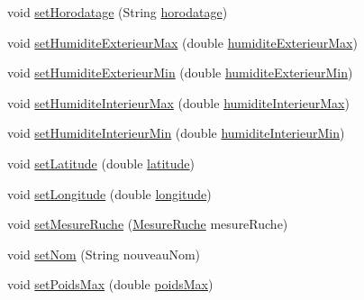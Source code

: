 \begin{DoxyCompactItemize}
\item 
void \hyperlink{classcom_1_1example_1_1bee__honeyt_1_1_ruche_aff1e1caa39a1d012b1714df3902941f8}{set\+Horodatage} (String \hyperlink{classcom_1_1example_1_1bee__honeyt_1_1_ruche_a93b3665d844cbba761ebf9a19a1d7d34}{horodatage})
\item 
void \hyperlink{classcom_1_1example_1_1bee__honeyt_1_1_ruche_a8ed5f5c7ede5ca2172306b91a0b6c9b7}{set\+Humidite\+Exterieur\+Max} (double \hyperlink{classcom_1_1example_1_1bee__honeyt_1_1_ruche_a76e636b4d5e0a18b187905e0d6d73a71}{humidite\+Exterieur\+Max})
\item 
void \hyperlink{classcom_1_1example_1_1bee__honeyt_1_1_ruche_ab4e0d29d75a71336a51dad3d4f17b758}{set\+Humidite\+Exterieur\+Min} (double \hyperlink{classcom_1_1example_1_1bee__honeyt_1_1_ruche_ad58b8815412827add256f6c6e11d3043}{humidite\+Exterieur\+Min})
\item 
void \hyperlink{classcom_1_1example_1_1bee__honeyt_1_1_ruche_aa17a8858db45900b9087e0f35bdf2e23}{set\+Humidite\+Interieur\+Max} (double \hyperlink{classcom_1_1example_1_1bee__honeyt_1_1_ruche_a1483266a1f1ba7d83e0f69bef8e26231}{humidite\+Interieur\+Max})
\item 
void \hyperlink{classcom_1_1example_1_1bee__honeyt_1_1_ruche_ac06e9c83418f30546fea5d29f250b323}{set\+Humidite\+Interieur\+Min} (double \hyperlink{classcom_1_1example_1_1bee__honeyt_1_1_ruche_ab8234d1bae28a10622b331d3b773445d}{humidite\+Interieur\+Min})
\item 
void \hyperlink{classcom_1_1example_1_1bee__honeyt_1_1_ruche_a38df72556466a10a52a4f3b799722532}{set\+Latitude} (double \hyperlink{classcom_1_1example_1_1bee__honeyt_1_1_ruche_a6a75dfabd9812334d502756f91fa4aa9}{latitude})
\item 
void \hyperlink{classcom_1_1example_1_1bee__honeyt_1_1_ruche_aef8fc612e8ccdabd8234bff9b335925c}{set\+Longitude} (double \hyperlink{classcom_1_1example_1_1bee__honeyt_1_1_ruche_aaeb7392ff8f3f26203e23f1dd57ae89f}{longitude})
\item 
void \hyperlink{classcom_1_1example_1_1bee__honeyt_1_1_ruche_ad98ddabc86442d12acd1047aa746138b}{set\+Mesure\+Ruche} (\hyperlink{classcom_1_1example_1_1bee__honeyt_1_1_mesure_ruche}{Mesure\+Ruche} mesure\+Ruche)
\item 
void \hyperlink{classcom_1_1example_1_1bee__honeyt_1_1_ruche_aae5d95d914d3d2c2e72c4bb9e9ab03f4}{set\+Nom} (String nouveau\+Nom)
\item 
void \hyperlink{classcom_1_1example_1_1bee__honeyt_1_1_ruche_a76fb01b4b1fd90662907635efe949a9e}{set\+Poids\+Max} (double \hyperlink{classcom_1_1example_1_1bee__honeyt_1_1_ruche_a5901bf432f6d2de0e5facb8952277cbc}{poids\+Max})

\end{DoxyCompactItemize}
